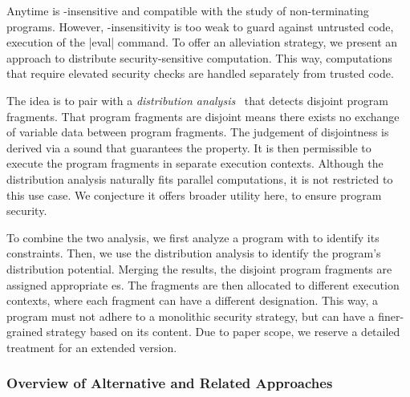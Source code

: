 Anytime  is
-insensitive
and compatible with the study of non-terminating programs. However,
-insensitivity is too weak to guard against untrusted code, \eg
execution of the \prc|eval| command. To offer an alleviation strategy, we
present an approach to distribute security-sensitive computation. This way,
computations that require elevated security checks are handled separately from
trusted code.

The idea is to pair \lname with a \emph{distribution
analysis}~\cite{aubert20232} that detects disjoint program fragments. That
program fragments are disjoint means there exists no exchange of variable data
between program fragments. The judgement of disjointness is derived via a sound
 that guarantees the property. It is then permissible to
execute the program fragments in separate execution contexts. Although the
distribution analysis naturally fits parallel computations, it is not restricted
to this use case. We conjecture it offers broader utility here, to ensure
program security.

To combine the two analysis, we first analyze a program with \lname to identify
its  constraints. Then, we use the distribution analysis
to identify the program's distribution potential. Merging the results, the
disjoint program fragments are assigned appropriate es. The
fragments are then allocated to different execution contexts, where each
fragment can have a different  designation. This way, a
program must not adhere to a monolithic security strategy, but can have a
finer-grained strategy based on its content. Due to paper scope, we reserve a
detailed treatment for an extended version.

\subsubsection{Overview of Alternative and Related Approaches}
\label{sec:ni-related-works}


